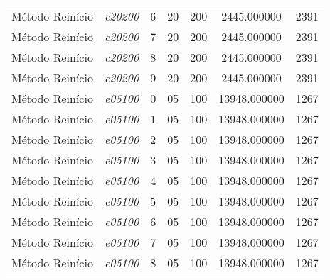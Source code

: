 {\begin{longtable}{cc|c|cc|cc}
			Método Reinício    & \textit{c20200}    & 6                               & 20               & 200              & 2445.000000                          & 2391 \\ 
			Método Reinício    & \textit{c20200}    & 7                               & 20               & 200              & 2445.000000                          & 2391 \\ 
			Método Reinício    & \textit{c20200}    & 8                               & 20               & 200              & 2445.000000                          & 2391 \\ 
			Método Reinício    & \textit{c20200}    & 9                               & 20               & 200              & 2445.000000                          & 2391 \\ \hline
			Método Reinício    & \textit{e05100}    & 0                               & 05               & 100              & 13948.000000                          & 1267 \\ 
			Método Reinício    & \textit{e05100}    & 1                               & 05               & 100              & 13948.000000                          & 1267 \\ 
			Método Reinício    & \textit{e05100}    & 2                               & 05               & 100              & 13948.000000                          & 1267 \\ 
			Método Reinício    & \textit{e05100}    & 3                               & 05               & 100              & 13948.000000                          & 1267 \\ 
			Método Reinício    & \textit{e05100}    & 4                               & 05               & 100              & 13948.000000                          & 1267 \\ 
			Método Reinício    & \textit{e05100}    & 5                               & 05               & 100              & 13948.000000                          & 1267 \\ 
			Método Reinício    & \textit{e05100}    & 6                               & 05               & 100              & 13948.000000                          & 1267 \\ 
			Método Reinício    & \textit{e05100}    & 7                               & 05               & 100              & 13948.000000                          & 1267 \\ 
			Método Reinício    & \textit{e05100}    & 8                               & 05               & 100              & 13948.000000                          & 1267 \\ 

\end{longtable}}
